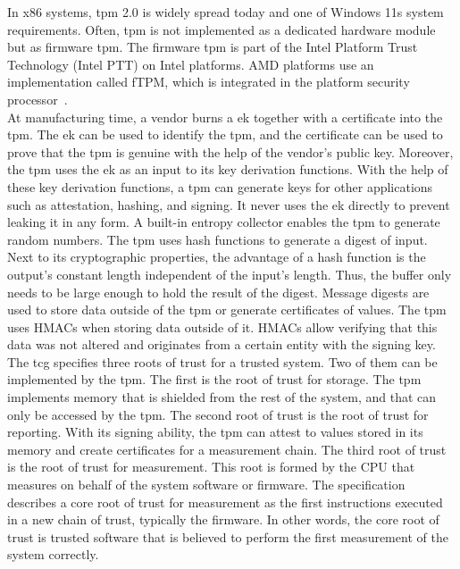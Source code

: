 In x86 systems, \gls{tpm} 2.0 is widely spread today and one of Windows 11s
system requirements. Often, \gls{tpm} is not implemented as a dedicated hardware
module but as firmware \gls{tpm}. The firmware \gls{tpm} is part of the Intel
Platform Trust Technology (Intel PTT) on Intel platforms. AMD platforms use an
implementation called fTPM, which is integrated in the platform security
processor~\cite{pirker2024brief}. \\

At manufacturing time, a vendor burns a \gls{ek} together with a certificate
into the \gls{tpm}. The \gls{ek} can be used to identify the \gls{tpm}, and the
certificate can be used to prove that the \gls{tpm} is genuine with the help of
the vendor's public key. Moreover, the \gls{tpm} uses the \gls{ek} as an input
to its key derivation functions. With the help of these key derivation
functions, a \gls{tpm} can generate keys for other applications such as
attestation, hashing, and signing. It never uses the \gls{ek} directly to
prevent leaking it in any form. A built-in entropy collector enables the
\gls{tpm} to generate random numbers. The \gls{tpm} uses hash functions to
generate a digest of input. Next to its cryptographic properties, the advantage
of a hash function is the output's constant length independent of the input's
length. Thus, the buffer only needs to be large enough to hold the result of the
digest. Message digests are used to store data outside of the \gls{tpm} or
generate certificates of values. The \gls{tpm} uses HMACs when storing data
outside of it. HMACs allow verifying that this data was not altered and
originates from a certain entity with the signing key.\\

The \gls{tcg} specifies three roots of trust for a trusted system. Two of them
can be implemented by the \gls{tpm}. The first is the root of trust for storage.
The \gls{tpm} implements memory that is shielded from the rest of the system,
and that can only be accessed by the \gls{tpm}. The second root of trust is the
root of trust for reporting. With its signing ability, the \gls{tpm} can attest
to values stored in its memory and create certificates for a measurement chain.
The third root of trust is the root of trust for measurement. This root is
formed by the CPU that measures on behalf of the system software or firmware.
The specification describes a core root of trust for measurement as the first
instructions executed in a new chain of trust, typically the firmware. In other
words, the core root of trust is trusted software that is believed to perform
the first measurement of the system correctly.\\

